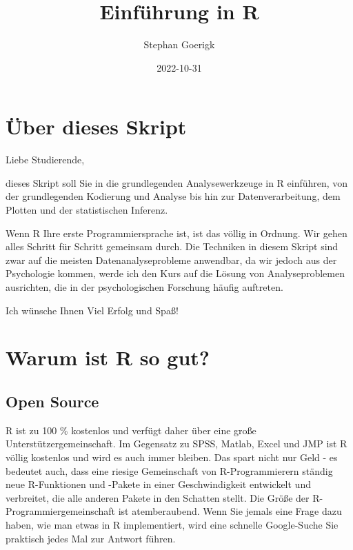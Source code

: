 \documentclass[
]{book}
\title{Einführung in R}
\author{Stephan Goerigk}
\date{2022-10-31}
\begin{document}
\maketitle

{
\setcounter{tocdepth}{1}
\tableofcontents
}
\hypertarget{uxfcber-dieses-skript}{%
\chapter*{Über dieses Skript}\label{uxfcber-dieses-skript}}

Liebe Studierende,

dieses Skript soll Sie in die grundlegenden Analysewerkzeuge in R einführen, von der grundlegenden Kodierung und Analyse bis hin zur Datenverarbeitung, dem Plotten und der statistischen Inferenz.

Wenn R Ihre erste Programmiersprache ist, ist das völlig in Ordnung. Wir gehen alles Schritt für Schritt gemeinsam durch. Die Techniken in diesem Skript sind zwar auf die meisten Datenanalyseprobleme anwendbar, da wir jedoch aus der Psychologie kommen, werde ich den Kurs auf die Lösung von Analyseproblemen ausrichten, die in der psychologischen Forschung häufig auftreten.

Ich wünsche Ihnen Viel Erfolg und Spaß!

\hypertarget{warum-ist-r-so-gut}{%
\chapter{Warum ist R so gut?}\label{warum-ist-r-so-gut}}

\hypertarget{open-source}{%
\section{Open Source}\label{open-source}}

R ist zu 100 \% kostenlos und verfügt daher über eine große Unterstützergemeinschaft. Im Gegensatz zu SPSS, Matlab, Excel und JMP ist R völlig kostenlos und wird es auch immer bleiben. Das spart nicht nur Geld - es bedeutet auch, dass eine riesige Gemeinschaft von R-Programmierern ständig neue R-Funktionen und -Pakete in einer Geschwindigkeit entwickelt und verbreitet, die alle anderen Pakete in den Schatten stellt. Die Größe der R-Programmiergemeinschaft ist atemberaubend. Wenn Sie jemals eine Frage dazu haben, wie man etwas in R implementiert, wird eine schnelle Google-Suche Sie praktisch jedes Mal zur Antwort führen.
\end{document}
